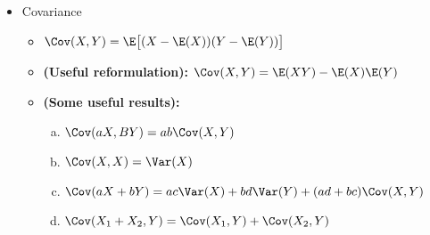 \begin{itemize}
\begin{itemize}
\begin{proof}
\[
= \E(X^2) - \E(X)^2 = \Var(X)
\]

\end{proof}

\begin{corollary} \textbf{(Rao-Blackwell Theorem.)} \(\Var(X) \geq \Var(\E(X \mid Y))\)

\end{corollary}

\begin{proof} Follows immediately from Theorem \ref{prob.ltv} by noting that since the variance is nonnegative, \(\E \big( \Var(X \mid Y) \big)  \geq 0\).

\end{proof}

\item \begin{proposition}\label{prob.const.var}If \(c \in \mathbb{R}\), then \(\Var(c) = 0\).
\end{proposition}

\end{itemize}

\item Covariance

\begin{itemize}

\item \begin{definition} \( \Cov(X, Y ) = \E \big[ (X - \E(X))(Y - \E(Y))\big] \) \end{definition}

\item \begin{proposition} \textbf{(Useful reformulation):} \(\Cov(X, Y) = \E(XY) - \E(X)\E(Y)\) \end{proposition}

\item \begin{theorem} \textbf{(Some useful results):} 


\begin{enumerate}[(a)]

\item \(\Cov(aX, BY) = ab \Cov(X, Y)\)

\item \(\Cov(X, X) = \Var(X)\)

\item \(\Cov(aX + bY) = ac\Var(X) + bd\Var(Y) + (ad + bc)\Cov(X, Y)\)

\item \(\Cov(X_1 + X_2, Y) = \Cov(X_1, Y) + \Cov(X_2, Y)\)


\end{enumerate}
\end{theorem}
\end{itemize}
\end{itemize}

